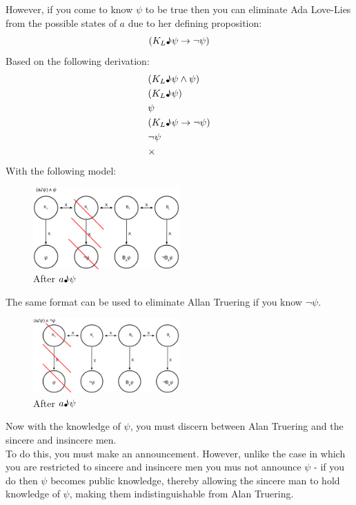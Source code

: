 \documentclass[12pt, titlepage, twoside, a4paper]{report}
\begin{document}
{However, if you come to know $\psi$ to be true then you can eliminate Ada Love-Lies from the possible states of $a$ due to her defining proposition: 
$$(K_L \text{\textmusicalnote} \psi \to \neg \psi)$$
Based on the following derivation:\\
\begin{align*}
&(K_L \text{\textmusicalnote} \psi \wedge \psi )\\
&(K_L \text{\textmusicalnote} \psi )\\
&\psi \\
&(K_L \text{\textmusicalnote} \psi \to \neg \psi )\\
&\neg \psi \\
&\times
\end{align*}
With the following model:\\
\begin{figure}[h!]
  \centering
  \includegraphics[width=0.5\textwidth]{slide41.eps}
  \caption{After $a \text{\textmusicalnote} \psi$}
\end{figure}
The same format can be used to eliminate Allan Truering if you know $\neg \psi$.\\
\begin{figure}[h!]
  \centering
  \includegraphics[width=0.5\textwidth]{slide42.eps}
  \caption{After $a \text{\textmusicalnote} \psi$}
\end{figure}
Now with the knowledge of $\psi$, you must discern between Alan Truering and the sincere and insincere men.\\
To do this, you must make an announcement. However, unlike the case in which you are restricted to sincere and insincere men you mus not announce $\psi$ - if you do then $\psi$ becomes public knowledge, thereby allowing the sincere man to hold knowledge of $\psi$, making them indistinguishable from Alan Truering.\\
}
\end{document}

